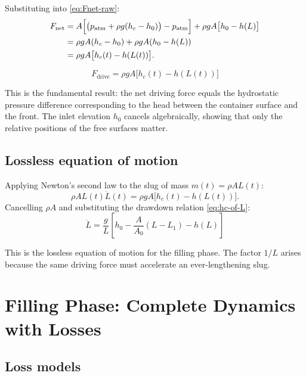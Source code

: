 \documentclass[11pt]{article}
\theoremstyle{definition}
\begin{document}
Substituting into \eqref{eq:Fnet-raw}:
\begin{align}
  F_{\text{net}} &= A\Bigl[\bigl(p_{\text{atm}} + \rho g(h_c - h_0)\bigr) - p_{\text{atm}}\Bigr]
                   + \rho g A\bigl[h_0 - h(L)\bigr] \notag \\
                 &= \rho g A (h_c - h_0) + \rho g A (h_0 - h(L)) \notag \\
                 &= \rho g A \bigl[h_c(t) - h(L(t))\bigr].
  \label{eq:Fdrive}
\end{align}

\begin{equation}
  \boxed{F_{\text{drive}} = \rho g A \bigl[h_c(t) - h(L(t))\bigr]}
  \label{eq:Fdrive-box}
\end{equation}

This is the fundamental result: the net driving force equals the hydrostatic pressure 
difference corresponding to the head between the container surface and the front. The inlet 
elevation $h_0$ cancels algebraically, showing that only the relative positions of the 
free surfaces matter.

\subsection{Lossless equation of motion}

Applying Newton's second law to the slug of mass $m(t) = \rho A L(t)$:
\[
  \rho A L(t) \ddot{L}(t) = \rho g A \bigl[h_c(t) - h(L(t))\bigr].
\]
Cancelling $\rho A$ and substituting the drawdown relation \eqref{eq:hc-of-L}:
\begin{equation}
  \boxed{\ddot{L} = \frac{g}{L}\left[h_0 - \frac{A}{A_0}(L - L_1) - h(L)\right]}
  \label{eq:lossless-EOM}
\end{equation}

This is the lossless equation of motion for the filling phase. The factor $1/L$ arises 
because the same driving force must accelerate an ever-lengthening slug.

\section{Filling Phase: Complete Dynamics with Losses}
\label{sec:filling}

\subsection{Loss models}
\end{document}
